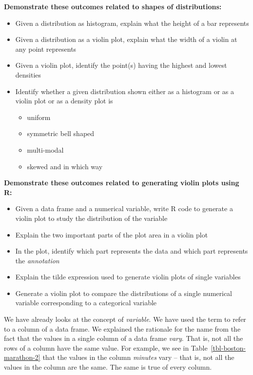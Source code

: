 \documentclass[
  12pt,
  letterpaper,
  DIV=11,
  numbers=noendperiod]{scrreprt}
\providecommand{\tightlist}{%
  \setlength{\itemsep}{0pt}\setlength{\parskip}{0pt}}
\begin{document}
\textbf{Demonstrate these outcomes related to shapes of distributions:}

\begin{itemize}
\tightlist
\item
  Given a distribution as histogram, explain what the height of a bar
  represents
\item
  Given a distribution as a violin plot, explain what the width of a
  violin at any point represents
\item
  Given a violin plot, identify the point(s) having the highest and
  lowest densities
\item
  Identify whether a given distribution shown either as a histogram or
  as a violin plot or as a density plot is

  \begin{itemize}
  \tightlist
  \item
    uniform
  \item
    symmetric bell shaped
  \item
    multi-modal
  \item
    skewed and in which way
  \end{itemize}
\end{itemize}

\textbf{Demonstrate these outcomes related to generating violin plots
using R:}

\begin{itemize}
\tightlist
\item
  Given a data frame and a numerical variable, write R code to generate
  a violin plot to study the distribution of the variable
\item
  Explain the two important parts of the plot area in a violin plot
\item
  In the plot, identify which part represents the data and which part
  represents the \emph{annotation}
\item
  Explain the tilde expression used to generate violin plots of single
  variables
\item
  Generate a violin plot to compare the distributions of a single
  numerical variable corresponding to a categorical variable
\end{itemize}

We have already looks at the concept of \emph{variable}. We have used
the term to refer to a column of a data frame. We explained the
rationale for the name from the fact that the values in a single column
of a data frame \emph{vary}. That is, not all the rows of a column have
the same value. For example, we see in Table~\ref{tbl-boston-marathon-2}
that the values in the column \emph{minutes} vary -- that is, not all
the values in the column are the same. The same is true of every column.
\end{document}

